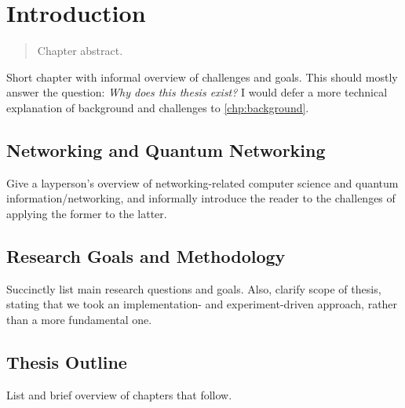 \chapter{Introduction}
\label{chp:intro}

\begin{refsection}

\begin{abstract}
Chapter abstract.
\end{abstract}

\newpage

\noindent
Short chapter with informal overview of challenges and goals. This should mostly answer the
question: \emph{Why does this thesis exist?} I would defer a more technical explanation of
background and challenges to \cref{chp:background}.

\section{Networking and Quantum Networking}

Give a layperson's overview of networking-related computer science and quantum
information/networking, and informally introduce the reader to the challenges of applying the former
to the latter.

\section{Research Goals and Methodology}

Succinctly list main research questions and goals. Also, clarify scope of thesis, stating that we
took an implementation- and experiment-driven approach, rather than a more fundamental one.

\section{Thesis Outline}

List and brief overview of chapters that follow.

\printbibliography[heading=subbibintoc,title={References}]

\end{refsection}
